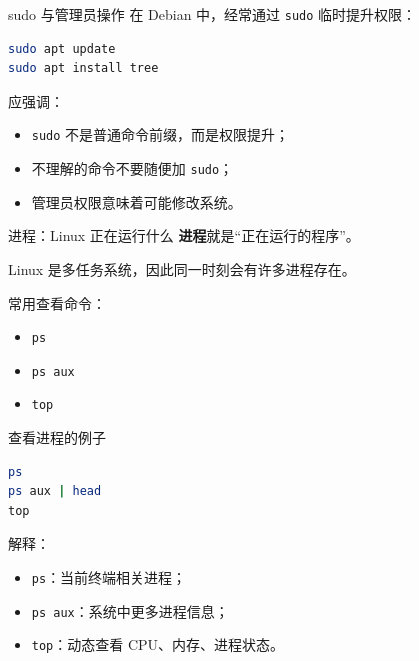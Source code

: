 \documentclass[aspectratio=169]{beamer}
\begin{document}
\begin{frame}[fragile]{sudo 与管理员操作}
在 Debian 中，经常通过 \texttt{sudo} 临时提升权限：

\begin{lstlisting}[language=bash]
sudo apt update
sudo apt install tree
\end{lstlisting}

\vspace{0.5em}
应强调：
\begin{itemize}
  \item \texttt{sudo} 不是普通命令前缀，而是权限提升；
  \item 不理解的命令不要随便加 \texttt{sudo}；
  \item 管理员权限意味着可能修改系统。
\end{itemize}
\end{frame}

\begin{frame}{进程：Linux 正在运行什么}
\textbf{进程}就是“正在运行的程序”。

\vspace{0.5em}
Linux 是多任务系统，因此同一时刻会有许多进程存在。

\vspace{0.5em}
常用查看命令：
\begin{itemize}
  \item \texttt{ps}
  \item \texttt{ps aux}
  \item \texttt{top}
\end{itemize}
\end{frame}

\begin{frame}[fragile]{查看进程的例子}
\begin{lstlisting}[language=bash]
ps
ps aux | head
top
\end{lstlisting}

\vspace{0.5em}
解释：
\begin{itemize}
  \item \texttt{ps}：当前终端相关进程；
  \item \texttt{ps aux}：系统中更多进程信息；
  \item \texttt{top}：动态查看 CPU、内存、进程状态。
\end{itemize}
\end{frame}
\end{document}
